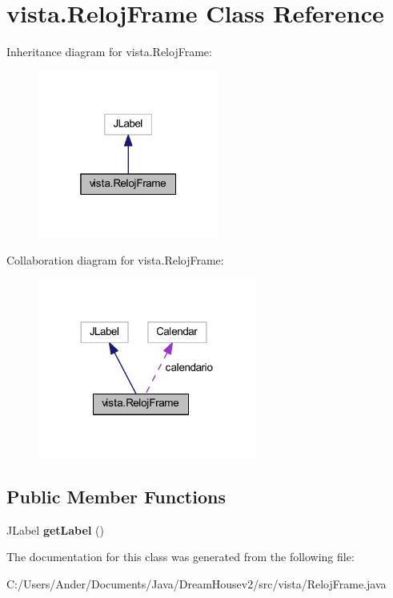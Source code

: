 \hypertarget{classvista_1_1_reloj_frame}{}\section{vista.\+Reloj\+Frame Class Reference}
\label{classvista_1_1_reloj_frame}


Inheritance diagram for vista.\+Reloj\+Frame\+:
\nopagebreak
\begin{figure}[H]
\begin{center}
\leavevmode
\includegraphics[width=169pt]{classvista_1_1_reloj_frame__inherit__graph}
\end{center}
\end{figure}


Collaboration diagram for vista.\+Reloj\+Frame\+:
\nopagebreak
\begin{figure}[H]
\begin{center}
\leavevmode
\includegraphics[width=204pt]{classvista_1_1_reloj_frame__coll__graph}
\end{center}
\end{figure}
\subsection*{Public Member Functions}
\begin{DoxyCompactItemize}
\item 
\mbox{\label{classvista_1_1_reloj_frame_a265ed4e08edcc3d106a9e64448e65abe}} 
J\+Label {\bfseries get\+Label} ()
\end{DoxyCompactItemize}


The documentation for this class was generated from the following file\+:\begin{DoxyCompactItemize}
\item 
C\+:/\+Users/\+Ander/\+Documents/\+Java/\+Dream\+Housev2/src/vista/Reloj\+Frame.\+java\end{DoxyCompactItemize}
